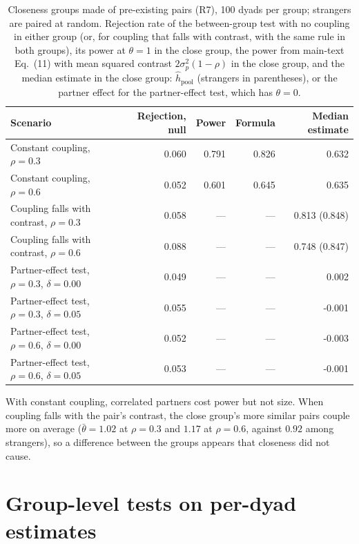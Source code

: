 \documentclass[12pt]{article}
\theoremstyle{definition}
\begin{document}
\begin{table}[H]
\centering\footnotesize
\caption{Closeness groups made of pre-existing pairs (R7), 100 dyads per group;
strangers are paired at random. Rejection rate of the between-group test with no
coupling in either group (or, for coupling that falls with contrast, with the same
rule in both groups), its power at $\theta=1$ in the close group, the power from
main-text Eq.~(11) with mean squared contrast $2\sigma_p^2(1-\rho)$
in the close group, and the median estimate in the close group: $\hat h_{\mathrm{pool}}$
(strangers in parentheses), or the partner effect for the partner-effect test,
which has $\theta=0$.}\label{tab:existing}
\setlength{\tabcolsep}{4pt}
\begin{tabular}{@{}lrrrr@{}}
\toprule
Scenario & Rejection, null & Power & Formula & Median estimate\\
\midrule
Constant coupling, $\rho=0.3$ & 0.060 & 0.791 & 0.826 & 0.632\\
Constant coupling, $\rho=0.6$ & 0.052 & 0.601 & 0.645 & 0.635\\
Coupling falls with contrast, $\rho=0.3$ & 0.058 & --- & --- & 0.813 (0.848)\\
Coupling falls with contrast, $\rho=0.6$ & 0.088 & --- & --- & 0.748 (0.847)\\
Partner-effect test, $\rho=0.3$, $\delta=0.00$ & 0.049 & --- & --- & 0.002\\
Partner-effect test, $\rho=0.3$, $\delta=0.05$ & 0.055 & --- & --- & -0.001\\
Partner-effect test, $\rho=0.6$, $\delta=0.00$ & 0.052 & --- & --- & -0.003\\
Partner-effect test, $\rho=0.6$, $\delta=0.05$ & 0.053 & --- & --- & -0.001\\
\bottomrule
\end{tabular}
\end{table}

With constant coupling, correlated partners cost power but not size. When coupling
falls with the pair's contrast, the close group's more similar pairs couple more on
average ($\bar\theta=1.02$ at $\rho=0.3$ and $1.17$ at $\rho=0.6$, against $0.92$
among strangers), so a difference between the groups appears that closeness did not
cause.

\section{Group-level tests on per-dyad estimates}\label{sec:rank}
\end{document}
